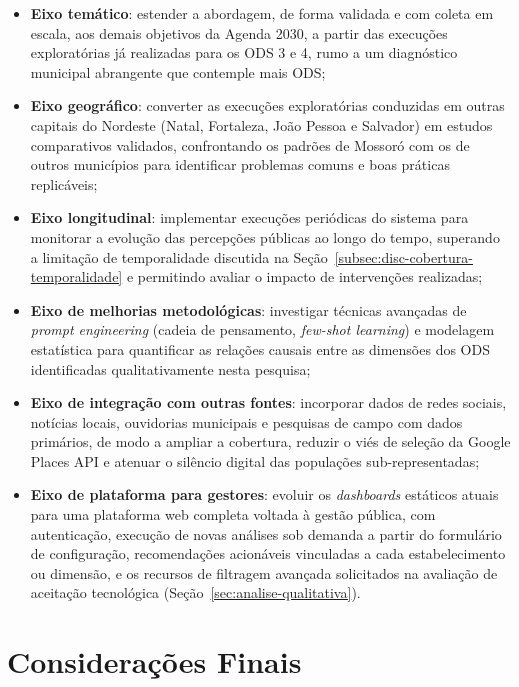 \begin{itemize}
    \item \textbf{Eixo temático}: estender a abordagem, de forma validada e com coleta em escala, aos demais objetivos da Agenda 2030, a partir das execuções exploratórias já realizadas para os ODS 3 e 4, rumo a um diagnóstico municipal abrangente que contemple mais ODS;
    \item \textbf{Eixo geográfico}: converter as execuções exploratórias conduzidas em outras capitais do Nordeste (Natal, Fortaleza, João Pessoa e Salvador) em estudos comparativos validados, confrontando os padrões de Mossoró com os de outros municípios para identificar problemas comuns e boas práticas replicáveis;
    \item \textbf{Eixo longitudinal}: implementar execuções periódicas do sistema para monitorar a evolução das percepções públicas ao longo do tempo, superando a limitação de temporalidade discutida na Seção~\ref{subsec:disc-cobertura-temporalidade} e permitindo avaliar o impacto de intervenções realizadas;
    \item \textbf{Eixo de melhorias metodológicas}: investigar técnicas avançadas de \textit{prompt engineering} (cadeia de pensamento, \textit{few-shot learning}) e modelagem estatística para quantificar as relações causais entre as dimensões dos ODS identificadas qualitativamente nesta pesquisa;
    \item \textbf{Eixo de integração com outras fontes}: incorporar dados de redes sociais, notícias locais, ouvidorias municipais e pesquisas de campo com dados primários, de modo a ampliar a cobertura, reduzir o viés de seleção da Google Places API e atenuar o silêncio digital das populações sub-representadas;
    \item \textbf{Eixo de plataforma para gestores}: evoluir os \textit{dashboards} estáticos atuais para uma plataforma web completa voltada à gestão pública, com autenticação, execução de novas análises sob demanda a partir do formulário de configuração, recomendações acionáveis vinculadas a cada estabelecimento ou dimensão, e os recursos de filtragem avançada solicitados na avaliação de aceitação tecnológica (Seção~\ref{sec:analise-qualitativa}).
\end{itemize}

\section{Considerações Finais}
\label{sec:consideracoes-finais}

